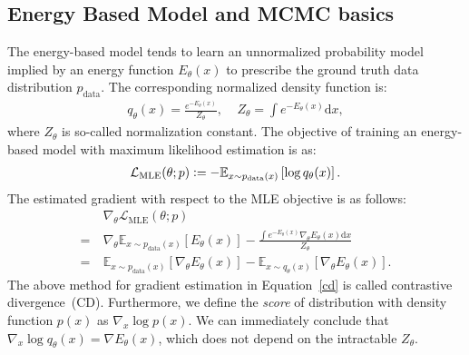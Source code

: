 \documentclass{article}
\def\gL{{\mathcal{L}}}
\newcommand{\bb}[1]{{\mathbb{#1}}}
\newcommand{\defeq}{\vcentcolon=}
\begin{document}
\subsection{Energy Based Model and MCMC basics}
\label{A}
The energy-based model tends to learn an unnormalized probability model implied by an energy function $E_\theta(x)$ to prescribe the ground truth data distribution $p_{\text{data}}$. The corresponding normalized density function is:
\begin{align}
    \label{partition_function}
    q_\theta(x) = \frac{e^{-E_\theta(x)}}{Z_{\theta}},~~~~~ Z_\theta = \int e^{-E_\theta(x)} \mathrm{d} x,
\end{align}
where $Z_\theta$ is so-called normalization constant.  
The objective of training an energy-based model with maximum likelihood estimation is as:
\begin{align}
    \label{mle}
    \gL_{\mathrm{MLE}}(\theta; p) \defeq -\bb{E}_{x \sim p_{\text{data}}(x)}\left[\log q_\theta(x)\right].
\end{align}
The estimated gradient with respect to the MLE objective is as follows:
\begin{align}
\label{cd}
    & \nabla_\theta \gL_{\mathrm{MLE}}(\theta; p) \\ \nonumber
=\ & \nabla_\theta \bb{E}_{x \sim p_{\text{data}}(x)}[E_\theta(x)] - \frac{\int e^{-E_\theta(x)} \nabla_\theta E_\theta(x) \mathrm{d} x}{Z_\theta} \\ \nonumber
    =\ & \bb{E}_{x \sim p_{\text{data}}(x)}[\nabla_\theta E_\theta(x)] - \bb{E}_{x \sim q_\theta(x)}[\nabla_\theta E_\theta(x)]\nonumber\label{eq:contrastive-divergence}.
\end{align}
The above method for gradient estimation in Equation~\ref{cd} is called contrastive divergence~(CD). 
Furthermore, we define the \emph{score} of distribution with density function $p(x)$ as $\nabla_x \log p(x)$. We can immediately conclude that $\nabla_x \log q_\theta(x) = \nabla E_\theta(x)$, which does not depend on the intractable $Z_\theta$.
\end{document}
